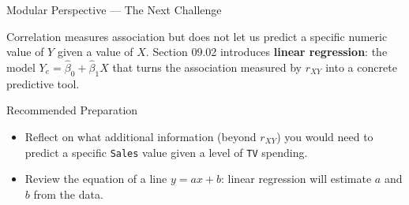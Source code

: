 \documentclass[10pt, aspectratio=169]{beamer}
\begin{document}
\begin{frame}{Modular Perspective --- The Next Challenge}
  \scriptsize
  \begin{retoclase}
    Correlation measures association but does not let us predict a specific numeric value of $Y$ given a value of $X$. Section 09.02 introduces \textbf{linear regression}: the model $Y_e=\hat\beta_0+\hat\beta_1X$ that turns the association measured by $r_{XY}$ into a concrete predictive tool.
  \end{retoclase}

  \vspace{0.08cm}
  \pause
  \begin{alertblock}{Recommended Preparation}
    \begin{itemize}\itemsep=0.06cm
      \item Reflect on what additional information (beyond $r_{XY}$) you would need to predict a specific \texttt{Sales} value given a level of \texttt{TV} spending.
      \item Review the equation of a line $y=ax+b$: linear regression will estimate $a$ and $b$ from the data.
    \end{itemize}
  \end{alertblock}
\end{frame}
\end{document}
